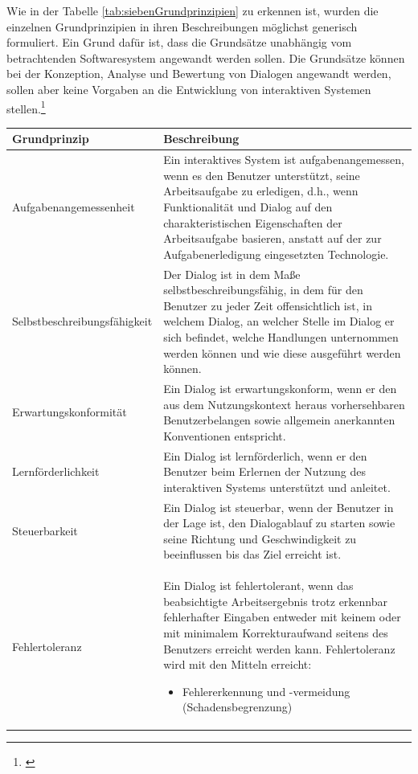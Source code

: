 Wie in der Tabelle \ref{tab:siebenGrundprinzipien} zu erkennen ist, wurden die einzelnen Grundprinzipien in ihren Beschreibungen möglichst generisch formuliert. Ein Grund dafür ist, dass die Grundsätze unabhängig vom betrachtenden Softwaresystem angewandt werden sollen. Die Grundsätze können bei der Konzeption, Analyse und Bewertung von Dialogen angewandt werden, sollen aber keine Vorgaben an die Entwicklung von interaktiven Systemen stellen.\footnote{\cite[vgl.][Kap. 4.1]{ISO9241-110}}
\begin{center}
\begin{longtable}{|p{5.1cm}|p{9.56cm}|} 
\hline
\textbf{Grundprinzip} & \textbf{Beschreibung} \\ \hline
Aufgabenangemessenheit & Ein interaktives System ist aufgabenangemessen, wenn es den Benutzer unterstützt, seine Arbeitsaufgabe zu erledigen, d.h., wenn Funktionalität und Dialog auf den charakteristischen Eigenschaften der Arbeitsaufgabe basieren, anstatt auf der zur Aufgabenerledigung eingesetzten Technologie. \\ \hline
Selbstbeschreibungsfähigkeit & Der Dialog ist in dem Maße selbstbeschreibungsfähig, in dem für den Benutzer zu jeder Zeit offensichtlich ist, in welchem Dialog, an welcher Stelle im Dialog er sich befindet, welche Handlungen unternommen werden können und wie diese ausgeführt werden können. \\ \hline
Erwartungskonformität & Ein Dialog ist erwartungskonform, wenn er den aus dem Nutzungskontext heraus vorhersehbaren Benutzerbelangen sowie allgemein anerkannten Konventionen entspricht. \\ \hline
Lernförderlichkeit & Ein Dialog ist lernförderlich, wenn er den Benutzer beim Erlernen der Nutzung des interaktiven Systems unterstützt und anleitet. \\ \hline
Steuerbarkeit & Ein Dialog ist steuerbar, wenn der Benutzer in der Lage ist, den Dialogablauf zu starten sowie seine Richtung und Geschwindigkeit zu beeinflussen bis das Ziel erreicht ist. \\ \hline
Fehlertoleranz & Ein Dialog ist fehlertolerant, wenn das beabsichtigte Arbeitsergebnis trotz erkennbar fehlerhafter Eingaben entweder mit keinem oder mit minimalem Korrekturaufwand seitens des Benutzers erreicht werden kann. Fehlertoleranz wird mit den Mitteln erreicht: 
\begin{itemize}
  \setlength{\itemsep}{0pt}
  \setlength{\parskip}{3pt}
  \setlength{\parsep}{2pt}
  \item Fehlererkennung und -vermeidung (Schadensbegrenzung)

\end{itemize}
\end{longtable}
\end{center}
